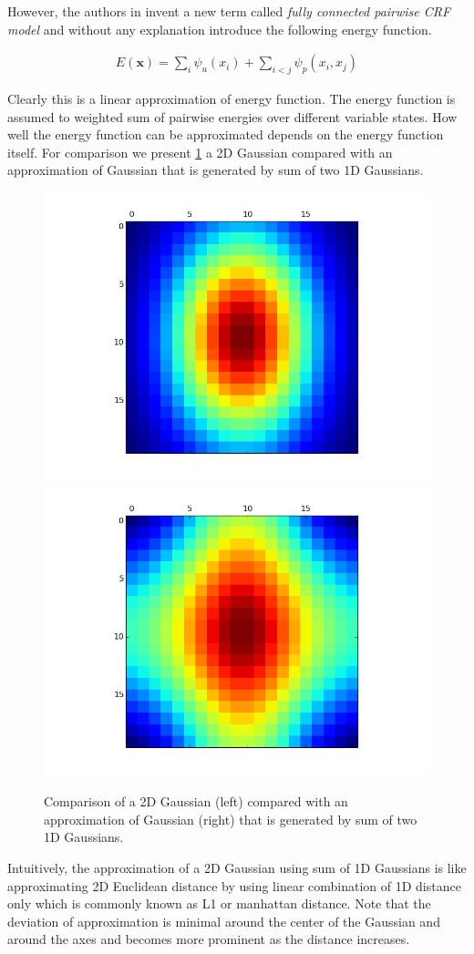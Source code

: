 \documentclass[10pt,twocolumn,letterpaper]{article}
\begin{document}
However, the authors in \cite{krahenbuhl2012efficient} invent a new term
called \emph{fully connected pairwise CRF model} and without any explanation 
introduce the following energy function.

\begin{align}
  E(\mathbf{x}) = \sum_i \psi_u(x_i) + \sum_{i < j} \psi_p(x_i, x_j)
\end{align}

Clearly this is a linear approximation of energy function. The energy function
is assumed to weighted sum of pairwise energies over different variable
states. How well the energy function can be approximated depends on the energy
function itself. For comparison we present \ref{fig:compare} a 2D Gaussian compared with an
approximation of Gaussian that is generated by sum of two 1D Gaussians.
\begin{figure}
  \includegraphics[width=0.5\columnwidth]{graphics/gaussian2D.png}%
  \includegraphics[width=0.5\columnwidth]{graphics/gaussianLinear1D.png}%
  \caption{Comparison of a 2D Gaussian (left) compared with an
    approximation of Gaussian (right) that is generated by sum of two 1D
  Gaussians.}
  \label{fig:compare}
\end{figure}

Intuitively, the approximation of a 2D Gaussian using sum of 1D Gaussians is
like approximating 2D Euclidean distance by using linear combination of 1D
distance only which is commonly known as L1 or manhattan distance. Note that
the deviation of approximation is minimal around the center of the Gaussian
and around the axes and becomes more prominent as the distance increases.
\end{document}
